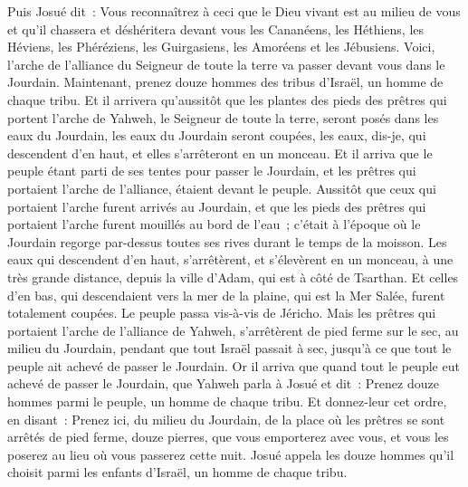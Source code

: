 \begin{multicols}{2}
Puis Josué dit~: Vous reconnaîtrez à ceci que le Dieu vivant est au milieu de vous et qu'il chassera et déshéritera devant vous les Cananéens, les Héthiens, les Héviens, les Phéréziens, les Guirgasiens, les Amoréens et les Jébusiens.
Voici, l'arche de l'alliance du Seigneur de toute la terre va passer devant vous dans le Jourdain.
Maintenant, prenez douze hommes des tribus d'Israël, un homme de chaque tribu.
Et il arrivera qu'aussitôt que les plantes des pieds des prêtres qui portent l'arche de Yahweh, le Seigneur de toute la terre, seront posés dans les eaux du Jourdain, les eaux du Jourdain seront coupées, les eaux, dis-je, qui descendent d'en haut, et elles s'arrêteront en un monceau.
Et il arriva que le peuple étant parti de ses tentes pour passer le Jourdain, et les prêtres qui portaient l'arche de l'alliance, étaient devant le peuple.
Aussitôt que ceux qui portaient l'arche furent arrivés au Jourdain, et que les pieds des prêtres qui portaient l'arche furent mouillés au bord de l'eau~; c'était à l'époque où le Jourdain regorge par-dessus toutes ses rives durant le temps de la moisson.
Les eaux qui descendent d'en haut, s'arrêtèrent, et s'élevèrent en un monceau, à une très grande distance, depuis la ville d'Adam, qui est à côté de Tsarthan. Et celles d'en bas, qui descendaient vers la mer de la plaine, qui est la Mer Salée, furent totalement coupées. Le peuple passa vis-à-vis de Jéricho.
Mais les prêtres qui portaient l'arche de l'alliance de Yahweh, s'arrêtèrent de pied ferme sur le sec, au milieu du Jourdain, pendant que tout Israël passait à sec, jusqu'à ce que tout le peuple ait achevé de passer le Jourdain.
\VerseOne{}Or il arriva que quand tout le peuple eut achevé de passer le Jourdain, que Yahweh parla à Josué et dit~:
Prenez douze hommes parmi le peuple, un homme de chaque tribu.
Et donnez-leur cet ordre, en disant~: Prenez ici, du milieu du Jourdain, de la place où les prêtres se sont arrêtés de pied ferme, douze pierres, que vous emporterez avec vous, et vous les poserez au lieu où vous passerez cette nuit.
Josué appela les douze hommes qu'il choisit parmi les enfants d'Israël, un homme de chaque tribu.

\end{multicols}
